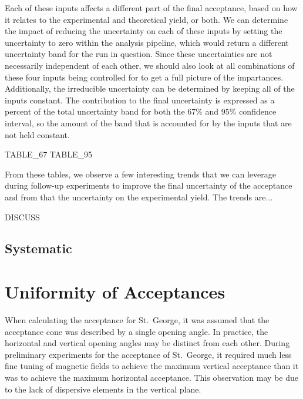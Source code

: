 Each of these inputs affects a different part of the final acceptance,
based on how it relates to the experimental and theoretical yield, or
both. We can determine the impact of reducing the uncertainty on each of
these inputs by setting the uncertainty to zero within the analysis
pipeline, which would return a different uncertainty band for the run in
question. Since these uncertainties are not necessarily independent of
each other, we should also look at all combinations of these four inputs
being controlled for to get a full picture of the impartances.
Additionally, the irreducible uncertainty can be determined by keeping
all of the inputs constant. The contribution to the final uncertainty is
expressed as a percent of the total uncertainty band for both the 67\%
and 95\% confidence interval, so the amount of the band that is
accounted for by the inputs that are not held constant.

TABLE_67
TABLE_95

From these tables, we observe a few interesting trends that we can
leverage during follow-up experiments to improve the final uncertainty
of the acceptance and from that the uncertainty on the experimental
yield. The trends are...

DISCUSS

\subsection{Systematic}


\section{Uniformity of Acceptances}
\label{sec:uniformity-of-acceptances}

When calculating the acceptance for St.\ George, it was assumed that the
acceptance cone was described by a single opening angle. In practice,
the horizontal and vertical opening angles may be distinct from each
other. During preliminary experiments for the acceptance of St.\ George,
it required much less fine tuning of magnetic fields to achieve the
maximum vertical acceptance than it was to achieve the maximum
horizontal acceptance. This observation may be due to the lack of
dispersive elements in the vertical plane.

